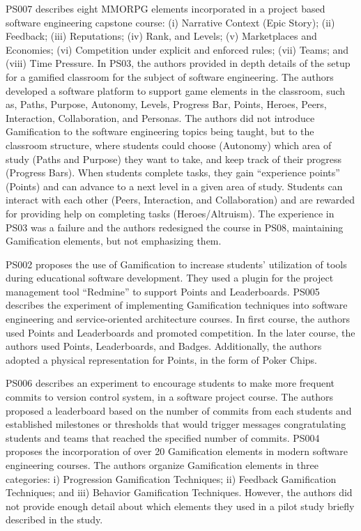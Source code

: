 PS007 describes eight MMORPG elements incorporated in a project based software engineering capstone course: (i) Narrative Context (Epic Story); (ii) Feedback; (iii) Reputations; (iv) Rank, and Levels; (v) Marketplaces and Economies; (vi) Competition under explicit and enforced rules; (vii) Teams; and (viii) Time Pressure. In PS03, the authors provided in depth details of the setup for a gamified classroom for the subject of software engineering. The authors developed a software platform to support game elements in the classroom, such as, Paths, Purpose, Autonomy, Levels, Progress Bar, Points, Heroes, Peers, Interaction, Collaboration, and Personas. The authors did not introduce Gamification to the software engineering topics being taught, but to the classroom structure, where students could choose (Autonomy) which area of study (Paths and Purpose) they want to take, and keep track of their progress (Progress Bars). When students complete tasks, they gain “experience points” (Points) and can advance to a next level in a given area of study. Students can interact with each other (Peers, Interaction, and Collaboration) and are rewarded for providing help on completing tasks (Heroes/Altruism). The experience in PS03 was a failure and the authors redesigned the course in PS08, maintaining Gamification elements, but not emphasizing them.
	
PS002 proposes the use of Gamification to increase students’ utilization of tools during educational software development. They used a plugin for the project management tool “Redmine” to support Points and Leaderboards. PS005 describes the experiment of implementing Gamification techniques into software engineering and service-oriented architecture courses. In first course, the authors used Points and Leaderboards and promoted competition. In the later course, the authors used Points, Leaderboards, and Badges. Additionally, the authors adopted a physical representation for Points, in the form of Poker Chips.
	
PS006 describes an experiment to encourage students to make more frequent commits to version control system, in a software project course. The authors proposed a leaderboard based on the number of commits from each students and established milestones or thresholds that would trigger messages congratulating students and teams that reached the specified number of commits. PS004 proposes the incorporation of over 20 Gamification elements in modern software engineering courses. The authors organize Gamification elements in three categories: i) Progression Gamification Techniques; ii) Feedback Gamification Techniques; and iii) Behavior Gamification Techniques. However, the authors did not provide enough detail about which elements they used in a pilot study briefly described in the study. 

